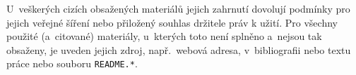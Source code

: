 \documentclass[
  program=itk,
  biblatex,
  figures=false,
  glossaries,
  index
]{kidiplom}
\begin{document}
U~veškerých cizích obsažených materiálů jejich
zahrnutí dovolují podmínky pro jejich veřejné šíření nebo přiložený souhlas
držitele práv k užití. Pro všechny použité (a~citované) materiály,
u~kterých toto není splněno a~nejsou tak obsaženy, je uveden
jejich zdroj, např.~webová adresa, v~bibliografii nebo textu práce
nebo souboru \texttt{README.*}.


\printglossary


\nocite{*}
\printbibliography

%
%

\printindex
\end{document}
